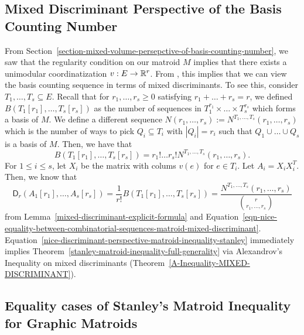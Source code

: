 \documentclass{puthesis-UG}
\begin{document}
\subsection{Mixed Discriminant Perspective of the Basis Counting Number} \label{sec:mixed-discriminant-stanley-basis}

From Section~\ref{section-mixed-volume-persepctive-of-basis-counting-number}, we saw that the regularity condition on our matroid $M$ implies that there exists a unimodular coordinatization $v : E \to \mathbb{R}^r$. From \cite{bapat_raghavan_1997}, this implies that we can view the basis counting sequence in terms of mixed discriminants. To see this, consider $T_1, \ldots, T_s \subseteq E$. Recall that for $r_1, \ldots, r_s \geq 0$ satisfying $r_1 + \ldots + r_s = r$, we defined $B(T_1[r_1], \ldots, T_s[r_s])$ as the number of sequences in $T_1^{r_1} \times \ldots \times T_s^{r_s}$ which forms a basis of $M$. We define a different sequence $N(r_1, \ldots, r_s) := N^{T_1, \ldots, T_s}(r_1, \ldots, r_s)$ which is the number of ways to pick $Q_i \subseteq T_i$ with $|Q_i| = r_i$ such that $Q_1 \cup \ldots \cup Q_s$ is a basis of $M$. Then, we have that
\begin{equation} \label{eqn-nice-equality-between-combinatorial-sequences-matroid-mixed-discriminant}
	B(T_1[r_1], \ldots, T_s[r_s]) = r_1! \ldots r_s! N^{T_1, \ldots, T_s}(r_1, \ldots, r_s).
\end{equation}
For $1 \leq i \leq s$, let $X_i$ be the matrix with colums $v(e)$ for $e \in T_i$. Let $A_i = X_i X_i^T$. Then, we know that 
\begin{equation} \label{nice-discriminant-perspective-matroid-inequality-stanley}
	\mathsf{D}_r (A_1[r_1], \ldots, A_s[r_s]) = \frac{1}{r!} B(T_1[r_1], \ldots, T_s[r_s]) = \frac{N^{T_1, \ldots, T_s}(r_1, \ldots, r_s)}{\binom{r}{r_1, \ldots, r_s}}
\end{equation}
from Lemma~\ref{mixed-discriminant-explicit-formula} and Equation~\ref{eqn-nice-equality-between-combinatorial-sequences-matroid-mixed-discriminant}. Equation~\ref{nice-discriminant-perspective-matroid-inequality-stanley} immediately implies Theorem~\ref{stanley-matroid-inequality-full-generality} via Alexandrov's Inequality on mixed discriminants (Theorem~\ref{A-Inequality-MIXED-DISCRIMINANT}). 


\subsection{Equality cases of Stanley's Matroid Inequality for Graphic Matroids}
\end{document}
